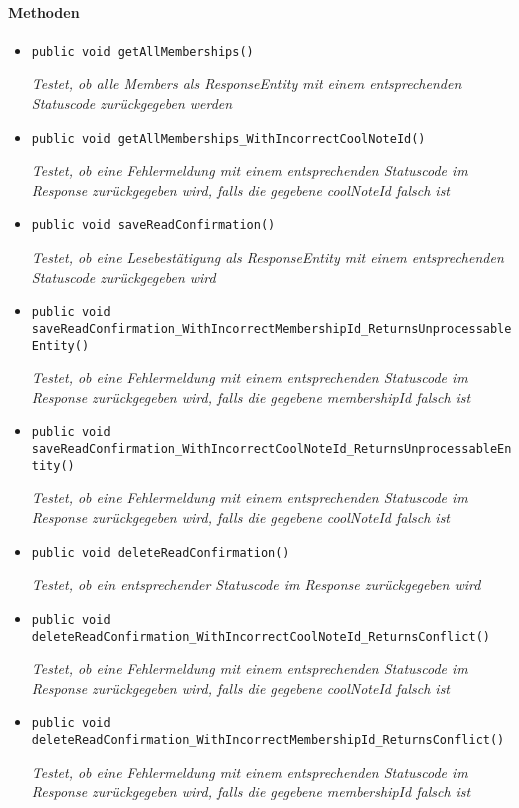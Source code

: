  \paragraph*{Methoden}
 \begin{itemize}
 	\item{\texttt{public void getAllMemberships()}}
 	
 	\textit{Testet, ob alle Members als ResponseEntity mit einem entsprechenden Statuscode zurückgegeben werden}
 	
 	\item{\texttt{public void getAllMemberships\_WithIncorrectCoolNoteId()}}
 	
 	\textit{Testet, ob eine Fehlermeldung mit einem entsprechenden Statuscode im Response zurückgegeben wird, falls die gegebene coolNoteId falsch ist}
 	
 	\item{\texttt{public void saveReadConfirmation()}}
 	
 	\textit{Testet, ob eine Lesebestätigung als ResponseEntity mit einem entsprechenden Statuscode zurückgegeben wird}
 	
 	\item{\texttt{public void saveReadConfirmation\_WithIncorrectMembershipId\_Returns\-UnprocessableEntity()}}
 	
 	\textit{Testet, ob eine Fehlermeldung mit einem entsprechenden Statuscode im Response zurückgegeben wird, falls die gegebene membershipId falsch ist}
 	
 	\item{\texttt{public void saveReadConfirmation\_WithIncorrectCoolNoteId\_Returns\-UnprocessableEntity()}}
 	
 	\textit{Testet, ob eine Fehlermeldung mit einem entsprechenden Statuscode im Response zurückgegeben wird, falls die gegebene coolNoteId falsch ist}
 	
 	\item{\texttt{public void deleteReadConfirmation()}}
 	
 	\textit{Testet, ob ein entsprechender Statuscode im Response zurückgegeben wird}
 	
 	\item{\texttt{public void deleteReadConfirmation\_WithIncorrectCoolNoteId\_Returns\-Conflict()}}
 	
 	\textit{Testet, ob eine Fehlermeldung mit einem entsprechenden Statuscode im Response zurückgegeben wird, falls die gegebene coolNoteId falsch ist}
 	
 	\item{\texttt{public void deleteReadConfirmation\_WithIncorrectMembershipId\_Returns\-Conflict()}}
 	
 	\textit{Testet, ob eine Fehlermeldung mit einem entsprechenden Statuscode im Response zurückgegeben wird, falls die gegebene membershipId falsch ist} 	
 \end{itemize}
 

